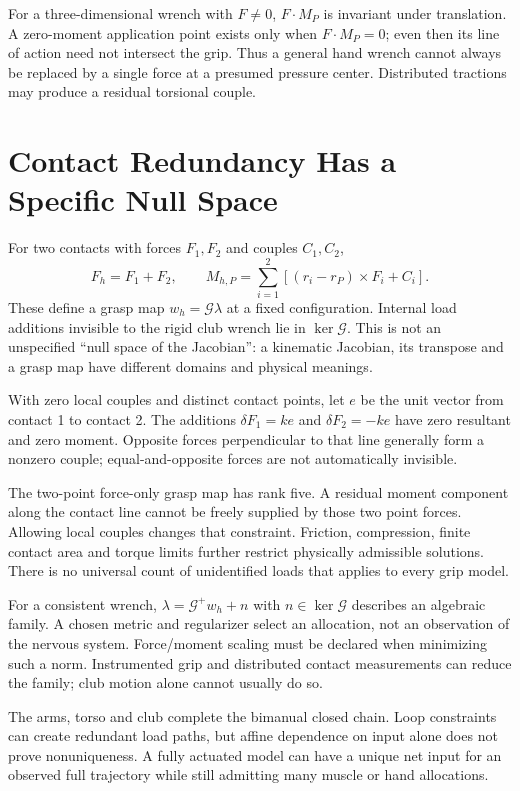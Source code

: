 \documentclass[11pt,a4paper]{article}
\begin{document}
For a three-dimensional wrench with $F\ne0$, $F\cdot M_P$ is invariant under translation. A zero-moment application point exists only when $F\cdot M_P=0$; even then its line of action need not intersect the grip. Thus a general hand wrench cannot always be replaced by a single force at a presumed pressure center. Distributed tractions may produce a residual torsional couple.

\section{Contact Redundancy Has a Specific Null Space}
For two contacts with forces $F_1,F_2$ and couples $C_1,C_2$,
\begin{equation}
F_h=F_1+F_2,\qquad
M_{h,P}=\sum_{i=1}^2[(r_i-r_P)\times F_i+C_i].
\end{equation}
These define a grasp map $w_h=\mathcal G\lambda$ at a fixed configuration. Internal load additions invisible to the rigid club wrench lie in $\ker\mathcal G$. This is not an unspecified ``null space of the Jacobian'': a kinematic Jacobian, its transpose and a grasp map have different domains and physical meanings.

With zero local couples and distinct contact points, let $e$ be the unit vector from contact 1 to contact 2. The additions $\delta F_1=ke$ and $\delta F_2=-ke$ have zero resultant and zero moment. Opposite forces perpendicular to that line generally form a nonzero couple; equal-and-opposite forces are not automatically invisible.

The two-point force-only grasp map has rank five. A residual moment component along the contact line cannot be freely supplied by those two point forces. Allowing local couples changes that constraint. Friction, compression, finite contact area and torque limits further restrict physically admissible solutions. There is no universal count of unidentified loads that applies to every grip model.

For a consistent wrench, $\lambda=\mathcal G^+w_h+n$ with $n\in\ker\mathcal G$ describes an algebraic family. A chosen metric and regularizer select an allocation, not an observation of the nervous system. Force/moment scaling must be declared when minimizing such a norm. Instrumented grip and distributed contact measurements can reduce the family; club motion alone cannot usually do so.

The arms, torso and club complete the bimanual closed chain. Loop constraints can create redundant load paths, but affine dependence on input alone does not prove nonuniqueness. A fully actuated model can have a unique net input for an observed full trajectory while still admitting many muscle or hand allocations.
\end{document}
